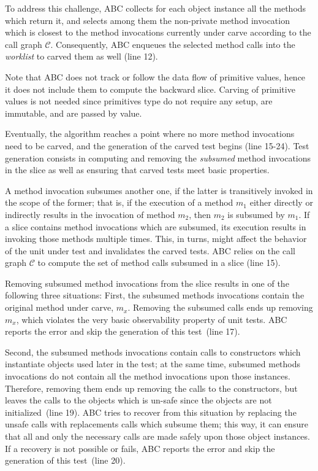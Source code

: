 \documentclass[10pt,conference]{IEEEtran}
\newcommand{\worklist}{\textit{worklist}\xspace}
\newcommand{\abc}{\textsf{ABC}\xspace}
\begin{document}
To address this challenge, \abc collects for each object instance all the methods which return it, 
and selects among them the non-private method invocation which is closest to the method invocations currently
under carve according to the call graph $\mathcal{C}$. Consequently, \abc enqueues the selected method calls into
the \worklist to carved them as well (line 12).

Note that \abc does not track or follow the data flow of primitive values, hence it does not include them to compute the backward slice.
Carving of primitive values is not needed since primitives type do not require any setup, are immutable, and are passed by value. 

Eventually, the algorithm reaches a point where no more method invocations need to be carved, 
and the generation of the carved test begins (line 15-24).
Test generation consists in computing and removing the \emph{subsumed} method invocations in the slice as
well as ensuring that carved tests meet basic properties.

A method invocation subsumes another one, if the latter is transitively invoked in the scope of the former;
that is, if the execution of a method $m_1$ either directly or indirectly results in the invocation of method $m_2$, 
then $m_2$ is subsumed by $m_1$.
%
If a slice contains method invocations which are subsumed, its execution results in invoking those methods multiple times.
This, in turns, might affect the behavior of the unit under test and invalidates the carved tests. 
\abc relies on the call graph $\mathcal{C}$ to compute the set of method calls subsumed in a slice (line 15).

Removing subsumed method invocations from the slice results in one of the following three situations:
First, the subsumed methods invocations contain the original method under carve, $m_x$. 
Removing the subsumed calls ends up removing $m_x$, which violates the very basic observability property of unit tests.
\abc reports the error and skip the generation of this test~(line 17).

Second, the subsumed methods invocations contain calls to constructors which instantiate objects used later in the test;
at the same time, subsumed methods invocations do not contain all the method invocations upon those instances. 
Therefore, removing them ends up removing the calls to the constructors, but leaves the calls to the objects which is un-safe
since the objects are not initialized~(line 19). \abc tries to recover from this situation by replacing
the unsafe calls with replacements calls which subsume them; this way, it can ensure that all and only the necessary calls
 are made safely upon those object instances. If a recovery is not possible or fails, \abc reports the error and
 skip the generation of  this test~(line 20).
\end{document}
